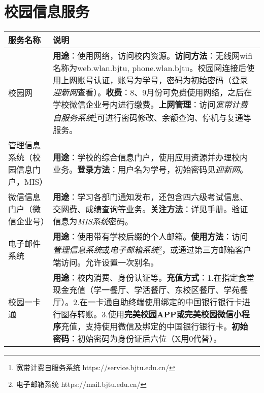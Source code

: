 \documentclass[a4paper]{ctexart}
\begin{document}
\appendix

\section{校园信息服务}

\begin{longtable}{m{}m{}}
	\hline
	\textbf{服务名称} & \textbf{说明} \\
	\hline
	校园网 & \textbf{用途}：使用网络，访问校内资源。\newline\textbf{访问方法}：无线网wifi名称为web.wlan.bjtu, phone.wlan.bjtu。校园网连接后使用上网账号认证，账号为学号，密码为初始密码（登录\textit{迎新网}查看）。\newline\textbf{收费}：8、9月份可免费使用网络，之后在学校微信企业号内进行缴费。\newline\textbf{上网管理}：访问\textit{宽带计费自服务系统}\footnote{宽带计费自服务系统 https://service.bjtu.edu.cn/}可进行密码修改、余额查询、停机与复通等服务。 \\
	\hline
	管理信息系统（校园信息门户，MIS） & \textbf{用途}：学校的综合信息门户，使用应用资源并办理校内业务。\newline\textbf{登录方法}：用户名为学号，初始密码见\textit{迎新网}。 \\
	\hline
	微信信息门户（微信企业号） & \textbf{用途}：学习各部门通知发布，还包含四六级考试信息、交网费、成绩查询等业务。\newline\textbf{关注方法}：详见手册。验证信息为\textit{MIS系统}密码。 \\
	\hline
	电子邮件系统 & \textbf{用途}：使用带有学校后缀的个人邮箱。\newline\textbf{使用方法}：访问\textit{管理信息系统}或\textit{电子邮箱系统}\footnote{电子邮箱系统 https://mail.bjtu.edu.cn/}，或通过第三方邮箱客户端访问。允许设置一次别名。 \\
	\hline
	校园一卡通 & \textbf{用途}：校内消费、身份认证等。\newline\textbf{充值方式}：1.在指定食堂现金充值（学一餐厅、学活餐厅、东校区餐厅、学苑餐厅）。2.在一卡通自助终端使用绑定的中国银行银行卡进行圈存转账。3.使用\textbf{完美校园APP或完美校园微信小程序}充值，支持使用微信及绑定的中国银行银行卡。\newline\textbf{初始密码}：初始密码为身份证后六位（X用0代替）。 \\
	\hline
	
\end{longtable}
\end{document}

